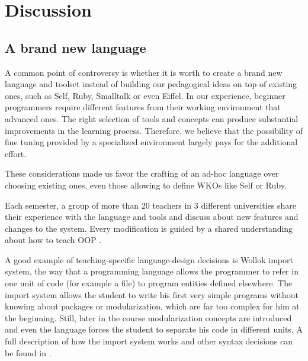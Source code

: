 \section{Discussion}
\label{sec:discussion}


\subsection{A brand new language}
\label{sec:newLanguage}
A common point of controversy is whether it is worth to create a brand new language and toolset
instead of building our pedagogical ideas on top of existing ones, such as Self, Ruby, Smalltalk or even Eiffel.
In our experience, beginner programmers require different features from their working environment that advanced ones.
The right selection of tools and concepts can produce substantial improvements in the learning process.
Therefore, we believe that the possibility of fine tuning provided by a specialized environment largely pays for the additional effort.

These considerations made us favor the crafting of an ad-hoc language over choosing existing ones, even those allowing to define WKOs like Self or Ruby.

Each semester, a group of more than 20 teachers in 3 different universities share their experience with the language and tools and discuss about new features and changes to the system. 
Every modification is guided by a shared understanding about how to teach OOP \cite{lombardi_instances_2007,lombardi_carlos_alumnos_2008,griggio_programming_2011,spigariol_lucas_ensenando_2013}.

A good example of teaching-specific language-design decisions is Wollok import system,
\ie the way that a programming language allows the programmer to refer in one unit of code (for example a file) to program entities defined elsewhere.
The import system allows the student to write his first very simple programs without knowing about packages or modularization, which are far too complex for him at the beginning. Still, later in the course modularization concepts are introduced and even the language forces the student to separate his code in different units. 
A full description of how the import system works and other syntax decisions can be found in \cite{javier_fernandes_wollok_2014}.

